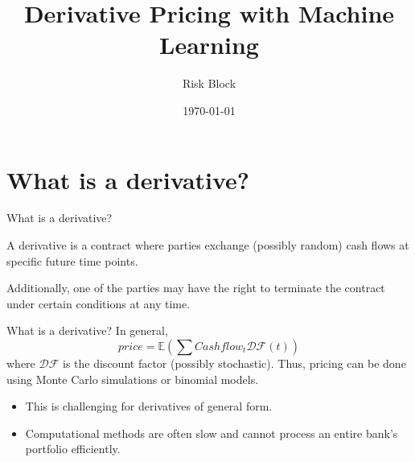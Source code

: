 \documentclass[10pt]{beamer}
\newcommand{\E}{\ensuremath{\mathbb{E}}}
\begin{document}
    \title[NN-based pricing]{Derivative Pricing with Machine Learning}
    \author{Risk Block}
    \date{\today}

    \begin{frame}
        \titlepage
    \end{frame}

    \section{What is a derivative?}
    \begin{frame}{What is a derivative?}

        A derivative is a contract where parties exchange (possibly random) cash flows at specific future time points.


        Additionally, one of the parties may have the right to terminate the contract under certain conditions at any time.
    \end{frame}

    \begin{frame}{What is a derivative?}
        In general,
        \[
            price = \E \left( \sum Cashflow_t \mathcal{DF}(t) \right)
        \]
        where $\mathcal{DF}$ is the discount factor (possibly stochastic).
        Thus, pricing can be done using Monte Carlo simulations or binomial models.
        \begin{itemize}
            \item This is challenging for derivatives of general form.
            \item Computational methods are often slow and cannot process an entire bank's portfolio efficiently.
        \end{itemize}
    \end{frame}
\end{document}

